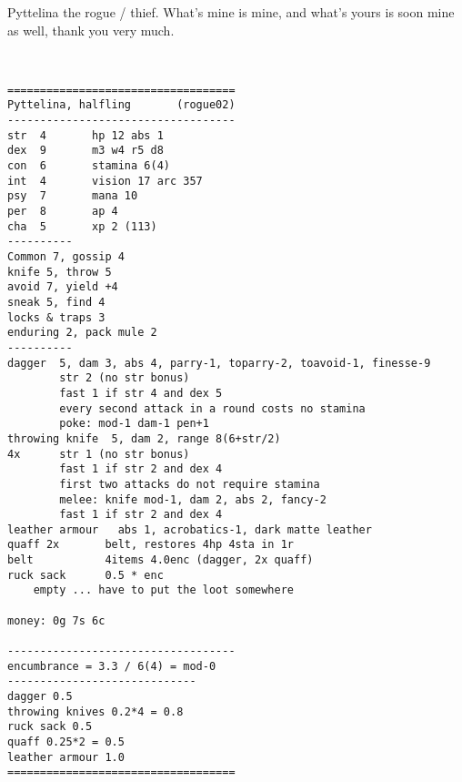 \clearpage
\begin{samepage}

\noindent Pyttelina the rogue / thief. What's mine is mine, and what's yours is soon mine as well, thank you very much.

\

\small \begin{verbatim}
===================================
Pyttelina, halfling       (rogue02)
-----------------------------------
str  4       hp 12 abs 1
dex  9       m3 w4 r5 d8
con  6       stamina 6(4)
int  4       vision 17 arc 357
psy  7       mana 10
per  8       ap 4
cha  5       xp 2 (113)
----------
Common 7, gossip 4
knife 5, throw 5
avoid 7, yield +4
sneak 5, find 4
locks & traps 3
enduring 2, pack mule 2
----------
dagger  5, dam 3, abs 4, parry-1, toparry-2, toavoid-1, finesse-9
        str 2 (no str bonus)
        fast 1 if str 4 and dex 5
        every second attack in a round costs no stamina
        poke: mod-1 dam-1 pen+1
throwing knife  5, dam 2, range 8(6+str/2)
4x      str 1 (no str bonus)
        fast 1 if str 2 and dex 4
        first two attacks do not require stamina
        melee: knife mod-1, dam 2, abs 2, fancy-2
        fast 1 if str 2 and dex 4
leather armour   abs 1, acrobatics-1, dark matte leather
quaff 2x       belt, restores 4hp 4sta in 1r
belt           4items 4.0enc (dagger, 2x quaff)
ruck sack      0.5 * enc
    empty ... have to put the loot somewhere

money: 0g 7s 6c

-----------------------------------
encumbrance = 3.3 / 6(4) = mod-0
-----------------------------
dagger 0.5
throwing knives 0.2*4 = 0.8
ruck sack 0.5
quaff 0.25*2 = 0.5
leather armour 1.0
===================================
\end{verbatim} \end{samepage} \normalsize






